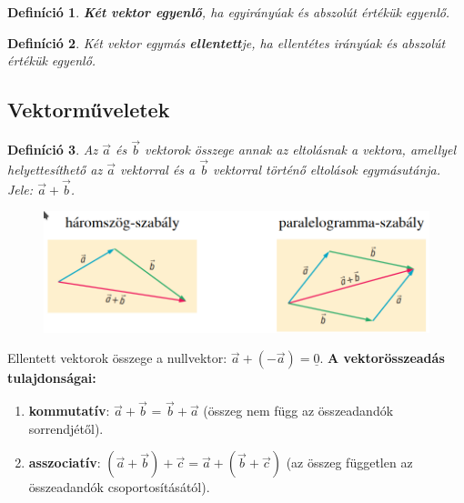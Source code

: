 \documentclass[12pt,a4paper]{article}
\newtheorem{definition}{Definíció} [section]
\begin{document}
\begin{definition}
\textbf{Két vektor egyenlő}, ha egyirányúak és abszolút értékük egyenlő.
\end{definition}

\begin{definition}
Két vektor egymás \textbf{ellentett}je, ha ellentétes irányúak és abszolút értékük egyenlő.
\end{definition}

\subsection{Vektorműveletek}

\begin{definition}
Az $\vec{a}$ és $\vec{b}$ vektorok összege annak az eltolásnak a vektora, amellyel helyettesíthető az $\vec{a}$ vektorral és a $\vec{b}$ vektorral történő eltolások egymásutánja. Jele: $\vec{a} + \vec{b}$.
\end{definition}
\begin{figure}[h!]
\centering
\includegraphics[scale=0.3]{geometry/vektor_osszeg}
\end{figure}

Ellentett vektorok összege a nullvektor: $\vec{a}+(-\vec{a})=\underline{0}$.
\newpage
\textbf{A vektorösszeadás tulajdonságai:}
\begin{enumerate}
\item  \textbf{kommutatív}: $\vec{a} + \vec{b}$ = $\vec{b} + \vec{a}$ (összeg nem függ az összeadandók sorrendjétől).
\item \textbf{asszociatív}: $(\vec{a} + \vec{b}) + \vec{c} = \vec{a} + (\vec{b} + \vec{c})$ (az összeg független az összeadandók csoportosításától).
\end{enumerate}
\end{document}
